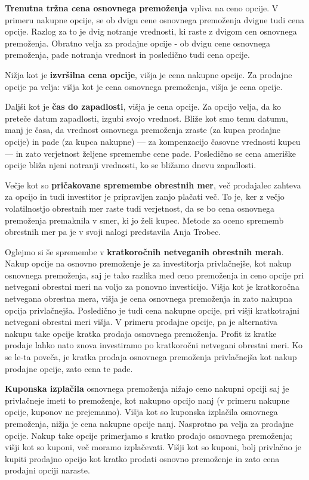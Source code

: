 \documentclass[a4paper]{article}
\begin{document}
\textbf{Trenutna tržna cena osnovnega premoženja} vpliva na ceno opcije. V primeru nakupne opcije, se ob 
dvigu cene osnovnega premoženja dvigne tudi cena opcije. Razlog za to je dvig notranje vrednosti,
 ki raste z dvigom cen osnovnega premoženja. Obratno velja za prodajne
opcije - ob dvigu cene osnovnega premoženja, pade notranja vrednost in posledično tudi cena opcije.

Nižja kot je \textbf{izvršilna cena opcije}, višja je cena nakupne opcije. Za prodajne opcije pa velja: višja kot je cena 
osnovnega premoženja, višja je cena opcije.

Daljši kot je \textbf{čas do zapadlosti}, višja je cena opcije. Za opcijo velja, da ko preteče datum zapadlosti, 
izgubi svojo vrednost.
Bliže kot smo temu datumu, manj je časa, da vrednost osnovnega premoženja zraste (za kupca prodajne opcije) in pade (za kupca nakupne) ---
za kompenzacijo časovne vrednosti kupcu --- in zato verjetnost željene spremembe cene pade. Posledično se cena ameriške opcije bliža njeni
notranji vrednosti, ko se bližamo dnevu zapadlosti.

Večje kot so \textbf{pričakovane spremembe obrestnih mer}, več prodajalec zahteva za opcijo in tudi investitor je pripravljen
zanjo plačati več. To je, ker z večjo volatilnostjo obrestnih mer raste tudi verjetnost, da se bo cena osnovnega premoženja premaknila
v smer, ki jo želi kupec. Metode za oceno sprememb obrestnih mer pa je v svoji nalogi predstavila Anja Trobec.

Oglejmo si še spremembe v \textbf{kratkoročnih netveganih obrestnih merah}. Nakup opcije na osnovno premoženje 
je za investitorja privlačnejše, kot nakup osnovnega premoženja, saj je tako razlika med ceno 
premoženja in ceno opcije pri netvegani obrestni meri na voljo za ponovno investicijo. Višja kot je kratkoročna netvegana 
obrestna mera, višja je cena osnovnega premoženja in zato nakupna opcija privlačnejša. Posledično je tudi cena nakupne opcije, pri 
višji kratkotrajni netvegani obrestni meri višja. V primeru prodajne opcije, pa je alternativa nakupu take opcije kratka prodaja
osnovnega premoženja. Profit iz kratke prodaje lahko nato znova investiramo po kratkoročni netvegani obrestni meri. Ko se le-ta poveča,
je kratka prodaja osnovnega premoženja privlačnejša kot nakup prodajne opcije, zato cena te pade.

\textbf{Kuponska izplačila} osnovnega premoženja nižajo ceno nakupni opciji saj je privlačneje imeti to premoženje, kot nakupno 
opcijo nanj (v primeru nakupne opcije, kuponov ne prejemamo). Višja kot so kuponska izplačila osnovnega premoženja, nižja je cena
nakupne opcije nanj. Nasprotno pa velja za prodajne opcije. Nakup take opcije primerjamo s kratko prodajo osnovnega premoženja;
višji kot so kuponi, več moramo izplačevati. Višji kot so kuponi, bolj privlačno je kupiti prodajno opcijo kot kratko prodati osnovno
premoženje in zato cena prodajni opciji naraste.
\end{document}
